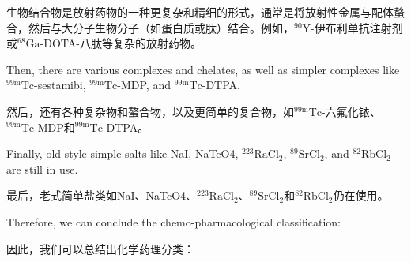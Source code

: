 \documentclass[dvipsnames, svgnames,a4paper,11pt]{article}
\begin{document}
生物结合物是放射药物的一种更复杂和精细的形式，通常是将放射性金属与配体螯合，然后与大分子生物分子（如蛋白质或肽）结合。例如，${}^\text{90}\text{Y}$-伊布利单抗注射剂或${}^\text{68}\text{Ga}$-DOTA-八肽等复杂的放射药物。


Then, there are various complexes and chelates, as well as simpler complexes like ${}^\text{99m}\text{Tc}$-sestamibi, ${}^\text{99m}\text{Tc}$-MDP, and ${}^\text{99m}\text{Tc}$-DTPA.

然后，还有各种复杂物和螯合物，以及更简单的复合物，如${}^\text{99m}\text{Tc}$-六氟化铱、${}^\text{99m}\text{Tc}$-MDP和${}^\text{99m}\text{Tc}$-DTPA。

Finally, old-style simple salts like NaI, NaTcO4, ${}^\text{223}\text{RaCl}_2$, ${}^\text{89}\text{SrCl}_2$, and ${}^\text{82}\text{RbCl}_2$ are still in use.

最后，老式简单盐类如NaI、NaTcO4、${}^\text{223}\text{RaCl}_2$、${}^\text{89}\text{SrCl}_2$和${}^\text{82}\text{RbCl}_2$仍在使用。

Therefore, we can conclude the chemo-pharmacological classification:

因此，我们可以总结出化学药理分类：
\end{document}

